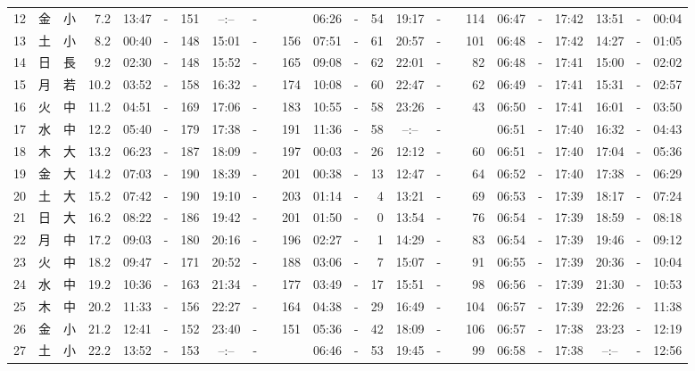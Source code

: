 \documentclass[12pt,a4j]{jsarticle}
\begin{document}
\begin{table}[htbp]
\begin{center}
{\begin{tabular}{|rc|cr|ccrccr|ccrccr|ccc|ccc|}
12 & 金 & 小 &  7.2 &  13:47 &-& 151 &  --:-- &-&~~~~~ &  06:26 &-&  54 &  19:17 &-& 114 & 06:47 & -& 17:42 & 13:51 & -& 00:04 \\
13 & 土 & 小 &  8.2 &  00:40 &-& 148 &  15:01 &-& 156 &  07:51 &-&  61 &  20:57 &-& 101 & 06:48 & -& 17:42 & 14:27 & -& 01:05 \\
14 & 日 & 長 &  9.2 &  02:30 &-& 148 &  15:52 &-& 165 &  09:08 &-&  62 &  22:01 &-&  82 & 06:48 & -& 17:41 & 15:00 & -& 02:02 \\
15 & 月 & 若 & 10.2 &  03:52 &-& 158 &  16:32 &-& 174 &  10:08 &-&  60 &  22:47 &-&  62 & 06:49 & -& 17:41 & 15:31 & -& 02:57 \\
16 & 火 & 中 & 11.2 &  04:51 &-& 169 &  17:06 &-& 183 &  10:55 &-&  58 &  23:26 &-&  43 & 06:50 & -& 17:41 & 16:01 & -& 03:50 \\
17 & 水 & 中 & 12.2 &  05:40 &-& 179 &  17:38 &-& 191 &  11:36 &-&  58 &  --:-- &-&~~~~~ & 06:51 & -& 17:40 & 16:32 & -& 04:43 \\
18 & 木 & 大 & 13.2 &  06:23 &-& 187 &  18:09 &-& 197 &  00:03 &-&  26 &  12:12 &-&  60 & 06:51 & -& 17:40 & 17:04 & -& 05:36 \\
19 & 金 & 大 & 14.2 &  07:03 &-& 190 &  18:39 &-& 201 &  00:38 &-&  13 &  12:47 &-&  64 & 06:52 & -& 17:40 & 17:38 & -& 06:29 \\
20 & 土 & 大 & 15.2 &  07:42 &-& 190 &  19:10 &-& 203 &  01:14 &-&   4 &  13:21 &-&  69 & 06:53 & -& 17:39 & 18:17 & -& 07:24 \\
21 & 日 & 大 & 16.2 &  08:22 &-& 186 &  19:42 &-& 201 &  01:50 &-&   0 &  13:54 &-&  76 & 06:54 & -& 17:39 & 18:59 & -& 08:18 \\
22 & 月 & 中 & 17.2 &  09:03 &-& 180 &  20:16 &-& 196 &  02:27 &-&   1 &  14:29 &-&  83 & 06:54 & -& 17:39 & 19:46 & -& 09:12 \\
23 & 火 & 中 & 18.2 &  09:47 &-& 171 &  20:52 &-& 188 &  03:06 &-&   7 &  15:07 &-&  91 & 06:55 & -& 17:39 & 20:36 & -& 10:04 \\
24 & 水 & 中 & 19.2 &  10:36 &-& 163 &  21:34 &-& 177 &  03:49 &-&  17 &  15:51 &-&  98 & 06:56 & -& 17:39 & 21:30 & -& 10:53 \\
25 & 木 & 中 & 20.2 &  11:33 &-& 156 &  22:27 &-& 164 &  04:38 &-&  29 &  16:49 &-& 104 & 06:57 & -& 17:39 & 22:26 & -& 11:38 \\
26 & 金 & 小 & 21.2 &  12:41 &-& 152 &  23:40 &-& 151 &  05:36 &-&  42 &  18:09 &-& 106 & 06:57 & -& 17:38 & 23:23 & -& 12:19 \\
27 & 土 & 小 & 22.2 &  13:52 &-& 153 &  --:-- &-&~~~~~ &  06:46 &-&  53 &  19:45 &-&  99 & 06:58 & -& 17:38 & --:-- & -& 12:56 \\

\end{tabular}}
\end{center}
\end{table}
\end{document}
